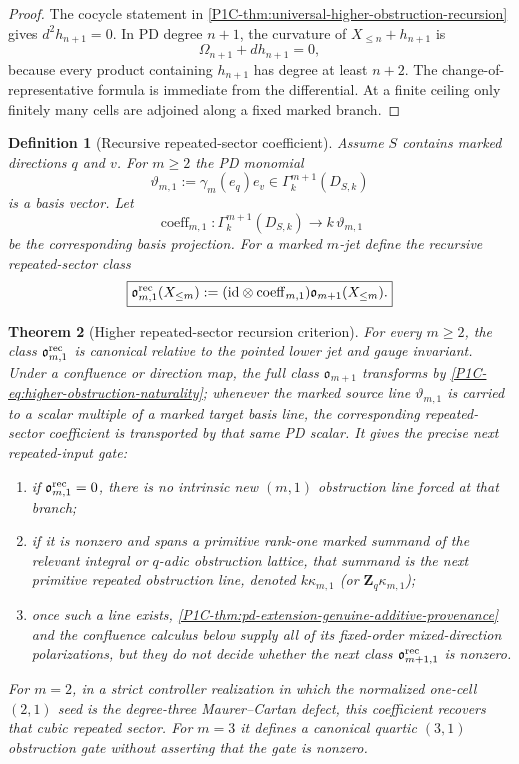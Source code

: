 \documentclass[11pt]{article}
\newtheorem{theorem}{Theorem}[section]
\newtheorem{definition}[theorem]{Definition}
\theoremstyle{remark}
\newcommand{\Z}{\mathbf Z}
\providecommand{\id}{\mathrm{id}}
\begin{document}
\begin{proof}
The cocycle statement in \cref{P1C-thm:universal-higher-obstruction-recursion} gives $d^2h_{n+1}=0$.  In PD degree $n+1$, the curvature of $X_{\le n}+h_{n+1}$ is
\[
 \Omega_{n+1}+dh_{n+1}=0,
\]
because every product containing $h_{n+1}$ has degree at least $n+2$.  The change-of-representative formula is immediate from the differential.  At a finite ceiling only finitely many cells are adjoined along a fixed marked branch.
\end{proof}

\begin{definition}[Recursive repeated-sector coefficient]\label{P1C-def:recursive-repeated-sector}
Assume $S$ contains marked directions $q$ and $v$.  For $m\ge2$ the PD monomial
\[
 \vartheta_{m,1}:=\gamma_m(e_q)e_v
 \in\Gamma_k^{m+1}(D_{S,k})
\]
is a basis vector.  Let
\[
 \operatorname{coeff}_{m,1}:\Gamma_k^{m+1}(D_{S,k})\to k\,\vartheta_{m,1}
\]
be the corresponding basis projection.  For a marked $m$-jet define the recursive repeated-sector class
\begin{equation}\label{P1C-eq:recursive-repeated-sector}
 \boxed{
 \mathfrak o^{\rm rec}_{m,1}(X_{\le m})
 :=
 (\id\otimes\operatorname{coeff}_{m,1})
 \mathfrak o_{m+1}(X_{\le m}).}
\end{equation}
\end{definition}

\begin{theorem}[Higher repeated-sector recursion criterion]\label{P1C-thm:higher-repeated-sector-recursion}
For every $m\ge2$, the class $\mathfrak o^{\rm rec}_{m,1}$ is canonical relative to the pointed lower jet and gauge invariant.  Under a confluence or direction map, the full class $\mathfrak o_{m+1}$ transforms by \eqref{P1C-eq:higher-obstruction-naturality}; whenever the marked source line $\vartheta_{m,1}$ is carried to a scalar multiple of a marked target basis line, the corresponding repeated-sector coefficient is transported by that same PD scalar.  It gives the precise next repeated-input gate:
\begin{enumerate}[label=\textup{(\roman*)}]
\item if $\mathfrak o^{\rm rec}_{m,1}=0$, there is no intrinsic new $(m,1)$ obstruction line forced at that branch;
\item if it is nonzero and spans a primitive rank-one marked summand of the relevant integral or $q$-adic obstruction lattice, that summand is the next primitive repeated obstruction line, denoted $k\kappa_{m,1}$ (or $\Z_q\kappa_{m,1}$);
\item once such a line exists, \cref{P1C-thm:pd-extension-genuine-additive-provenance} and the confluence calculus below supply all of its fixed-order mixed-direction polarizations, but they do not decide whether the next class $\mathfrak o^{\rm rec}_{m+1,1}$ is nonzero.
\end{enumerate}
For $m=2$, in a strict controller realization in which the normalized one-cell $(2,1)$ seed is the degree-three Maurer--Cartan defect, this coefficient recovers that cubic repeated sector.  For $m=3$ it defines a canonical quartic $(3,1)$ obstruction gate without asserting that the gate is nonzero.
\end{theorem}
\end{document}
